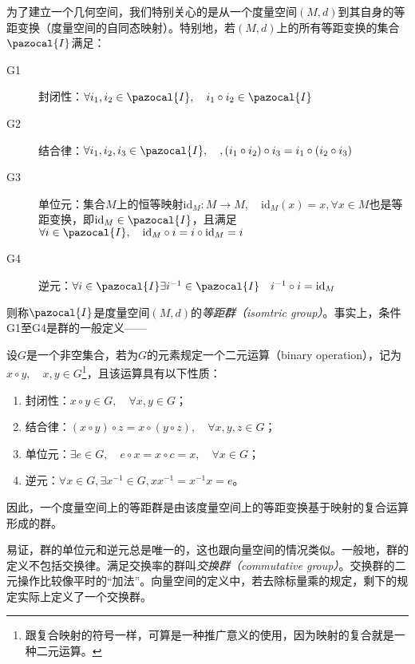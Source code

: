 \documentclass[main.tex]{subfiles}
\begin{document}
为了建立一个几何空间，我们特别关心的是从一个度量空间$\left(M,d\right)$到其自身的等距变换（度量空间的自同态映射）。特别地，若$\left(M,d\right)$上的所有等距变换的集合$\pazocal{I}$满足：
\begin{description}
    \item[G1] 封闭性：$\forall i_1,i_2\in\pazocal{I},\quad i_1\circ i_2\in\pazocal{I}$
    \item[G2] 结合律：$\forall i_1,i_2,i_3\in\pazocal{I},\quad,\left(i_1\circ i_2\right)\circ i_3=i_1\circ\left(i_2\circ i_3\right)$
    \item[G3] 单位元：集合$M$上的恒等映射$\mathrm{id}_M:M\rightarrow M,\quad\mathrm{id}_M\left(x\right)=x,\forall x\in M$也是等距变换，即$\mathrm{id}_M\in\pazocal{I}$，且满足$\forall i\in\pazocal{I},\quad\mathrm{id}_M\circ i=i\circ\mathrm{id}_M=i$
    \item[G4] 逆元：$\forall i\in\pazocal{I}\exists i^{-1}\in\pazocal{I}\quad i^{-1}\circ i=\mathrm{id}_M$
\end{description}
则称$\pazocal{I}$是度量空间$\left(M,d\right)$的\emph{等距群（isomtric group）}。事实上，条件G1至G4是群的一般定义——

\begin{definition}[群]\label{def:II.3.3}
    设$G$是一个非空集合，若为$G$的元素规定一个二元运算（binary operation），记为$x\circ y,\quad x,y\in G$\footnote{跟复合映射的符号一样，可算是一种推广意义的使用，因为映射的复合就是一种二元运算。}，且该运算具有以下性质：
    \begin{enumerate}
        \item 封闭性：$x\circ y\in G,\quad\forall x,y\in G$；
        \item 结合律：$\left(x\circ y\right)\circ z=x\circ\left(y\circ z\right),\quad\forall x,y,z\in G$；
        \item 单位元：$\exists e\in G,\quad e\circ x=x\circ c=x,\quad\forall x\in G$；
        \item 逆元：$\forall x\in G,\exists x^{-1}\in G,xx^{-1}=x^{-1}x=e$。
    \end{enumerate}
\end{definition}

因此，一个度量空间上的等距群是由该度量空间上的等距变换基于映射的复合运算形成的群。

易证，群的单位元和逆元总是唯一的，这也跟向量空间的情况类似。一般地，群的定义不包括交换律。满足交换率的群叫\emph{交换群（commutative group）}。交换群的二元操作比较像平时的“加法”。向量空间的定义中，若去除标量乘的规定，剩下的规定实际上定义了一个交换群。
\end{document}
